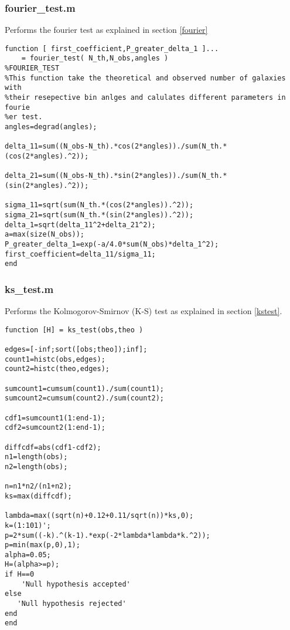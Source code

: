 \subsubsection*{fourier\_test.m}
Performs the fourier test as explained in section \ref{fourier}
\begin{verbatim}
function [ first_coefficient,P_greater_delta_1 ]...
    = fourier_test( N_th,N_obs,angles )
%FOURIER_TEST
%This function take the theoretical and observed number of galaxies with 
%their resepective bin anlges and calulates different parameters in fourie
%er test.
angles=degrad(angles);

delta_11=sum((N_obs-N_th).*cos(2*angles))./sum(N_th.*(cos(2*angles).^2));

delta_21=sum((N_obs-N_th).*sin(2*angles))./sum(N_th.*(sin(2*angles).^2));

sigma_11=sqrt(sum(N_th.*(cos(2*angles)).^2));
sigma_21=sqrt(sum(N_th.*(sin(2*angles)).^2));
delta_1=sqrt(delta_11^2+delta_21^2);
a=max(size(N_obs));
P_greater_delta_1=exp(-a/4.0*sum(N_obs)*delta_1^2);
first_coefficient=delta_11/sigma_11;
end
\end{verbatim}
\subsubsection*{ks\_test.m}
Performs the Kolmogorov-Smirnov (K-S) test as explained in section \ref{kstest}.
\begin{verbatim}
function [H] = ks_test(obs,theo )

edges=[-inf;sort([obs;theo]);inf];
count1=histc(obs,edges);
count2=histc(theo,edges);

sumcount1=cumsum(count1)./sum(count1);
sumcount2=cumsum(count2)./sum(count2);

cdf1=sumcount1(1:end-1);
cdf2=sumcount2(1:end-1);

diffcdf=abs(cdf1-cdf2);
n1=length(obs);
n2=length(obs);

n=n1*n2/(n1+n2);
ks=max(diffcdf);

lambda=max((sqrt(n)+0.12+0.11/sqrt(n))*ks,0);
k=(1:101)';
p=2*sum((-k).^(k-1).*exp(-2*lambda*lambda*k.^2));
p=min(max(p,0),1);
alpha=0.05;
H=(alpha>=p);
if H==0
    'Null hypothesis accepted'
else
   'Null hypothesis rejected'
end
end

\end{verbatim}
